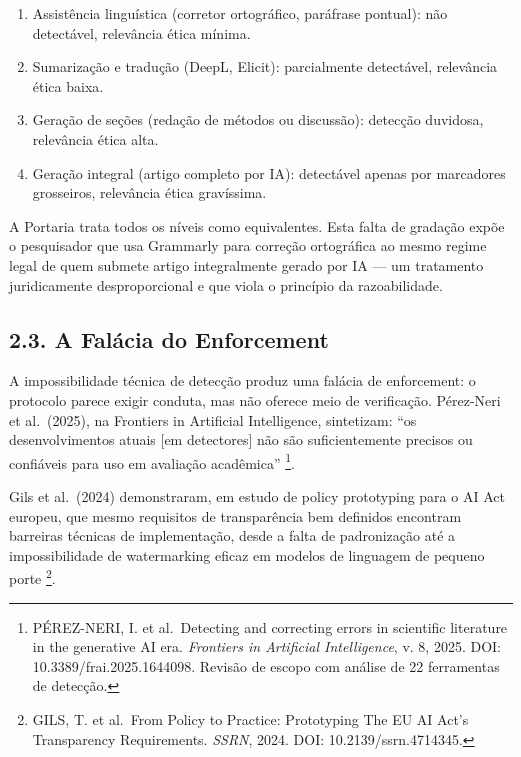 \documentclass[
  12pt,
  a4paper,
  brazil,
  twoside
]{report}
\begin{document}
\begin{enumerate}
\def\labelenumi{\arabic{enumi}.}
\tightlist
\item
  Assistência linguística (corretor ortográfico, paráfrase pontual): não
  detectável, relevância ética mínima.
\item
  Sumarização e tradução (DeepL, Elicit): parcialmente detectável,
  relevância ética baixa.
\item
  Geração de seções (redação de métodos ou discussão): detecção
  duvidosa, relevância ética alta.
\item
  Geração integral (artigo completo por IA): detectável apenas por
  marcadores grosseiros, relevância ética gravíssima.
\end{enumerate}

A Portaria trata todos os níveis como equivalentes. Esta falta de
gradação expõe o pesquisador que usa Grammarly para correção ortográfica
ao mesmo regime legal de quem submete artigo integralmente gerado por IA
--- um tratamento juridicamente desproporcional e que viola o princípio
da razoabilidade.

\subsection{2.3. A Falácia do
Enforcement}\label{a-faluxe1cia-do-enforcement}

A impossibilidade técnica de detecção produz uma falácia de enforcement:
o protocolo parece exigir conduta, mas não oferece meio de verificação.
Pérez-Neri et al.~(2025), na Frontiers in Artificial Intelligence,
sintetizam: ``os desenvolvimentos atuais {[}em detectores{]} não são
suficientemente precisos ou confiáveis para uso em avaliação acadêmica''
\footnote{PÉREZ-NERI, I. et al.~Detecting and correcting errors in
  scientific literature in the generative AI era. \emph{Frontiers in
  Artificial Intelligence}, v. 8, 2025. DOI: 10.3389/frai.2025.1644098.
  Revisão de escopo com análise de 22 ferramentas de detecção.}.

Gils et al.~(2024) demonstraram, em estudo de policy prototyping para o
AI Act europeu, que mesmo requisitos de transparência bem definidos
encontram barreiras técnicas de implementação, desde a falta de
padronização até a impossibilidade de watermarking eficaz em modelos de
linguagem de pequeno porte \footnote{GILS, T. et al.~From Policy to
  Practice: Prototyping The EU AI Act's Transparency Requirements.
  \emph{SSRN}, 2024. DOI: 10.2139/ssrn.4714345.}.
\end{document}
